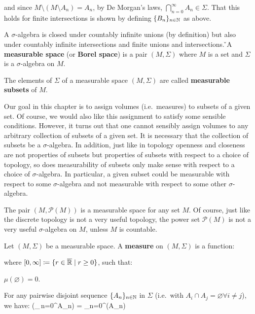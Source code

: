 and since $M\setminus(M\setminus A_n)=A_n$, by De Morgan's laws, $\bigcap_{n=0}^{\infty}{A_n} \in \Sigma$. That this
holds for finite intersections is shown by defining $\{B_n\}_{n\in \mathbb{N}}$ as above. \qedhere
\een
\eq

A $\sigma$-algebra is closed under countably infinite unions (by definition) but also under countably infinite
intersections and finite unions and intersections. \v

A \textbf{measurable space} (or \textbf{Borel space}) is a pair $(M,\Sigma)$ where $M$ is a set and $\Sigma$ is a
$\sigma$-algebra on $M$.
\ed

The elements of $\Sigma$ of a measurable space $(M,\Sigma)$ are called \textbf{measurable subsets} of $M$.
\ed

Our goal in this chapter is to assign volumes (i.e.\ measures) to subsets of a given set. Of course, we would also
like this assignment to satisfy some sensible conditions. However, it turns out that one cannot sensibly assign
volumes to any arbitrary collection of subsets of a given set. It is necessary that the collection of subsets be a
$\sigma$-algebra. In addition, just like in topology openness and closeness are not properties of subsets but
properties of subsets with respect to a choice of topology, so does measurability of subsets only make sense with
respect to a choice of $\sigma$-algebra. In particular, a given subset could be measurable with respect to some
$\sigma$-algebra and not measurable with respect to some other $\sigma$-algebra.

\be
The pair $(M,\mathscr{P}(M))$ is a measurable space for any set $M$. Of course, just like the discrete topology is
not a very useful topology, the power set $\mathscr{P}(M)$ is not a very useful $\sigma$-algebra on $M$, unless $M$
is countable.
\ee

\bd [Measure]
Let $(M,\Sigma)$ be a measurable space. A \textbf{measure} on $(M,\Sigma)$ is a function:
\bse
\mu\cl\Sigma\to[0,\infty]
\ese

where $[0,\infty] \coloneqq \{r\in\overline{\mathbb{R}}\mid r \geq 0\}$, such that:
\ben[label=(\roman*)]
\item $\mu(\varnothing)=0$.
\item For any pairwise disjoint sequence $\{A_n\}_{n\in \mathbb{N}}$ in $\Sigma$ (i.e.\ with $A_i\cap A_j = \varnothing \forall
i\neq j$), we have:
\bse
\mu\biggl(\bigcup_{\,n=0}^{\infty}A_n\biggr) = \sum_{n=0}^{\infty}\mu(A_n)
\ese

